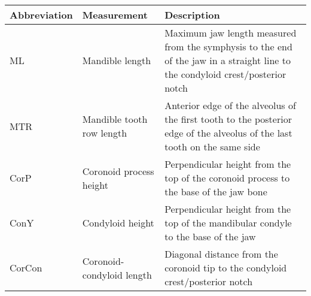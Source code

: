 
\begin{tabular}{p{2.5cm}p{3.2cm}p{7.5cm}}
\hline
\textbf{Abbreviation} & \textbf{Measurement} & \textbf{Description}\\
\hline
ML & Mandible length & Maximum jaw length measured from the symphysis to the end of the jaw in a straight line to the condyloid crest/posterior notch\\
MTR & Mandible tooth row length & Anterior edge of the alveolus of the first tooth to the posterior edge of the alveolus of the last tooth on the same side\\
CorP & Coronoid process height & Perpendicular height from the top of the coronoid process to the base of the jaw bone\\
ConY & Condyloid height & Perpendicular height from the top of the mandibular condyle to the base of the jaw\\
CorCon & Coronoid-condyloid length & Diagonal distance from the coronoid tip to the condyloid crest/posterior notch \citep{Carraway1996}\\
\hline
\end{tabular}